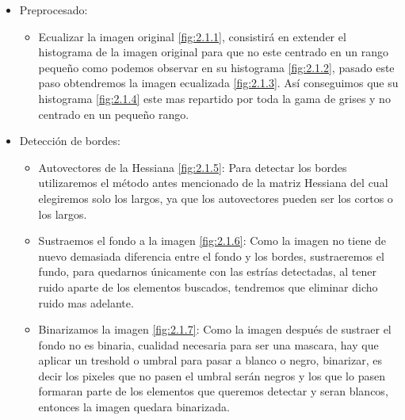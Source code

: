 \begin{itemize}
\item Preprocesado:
	\begin{itemize}
		\item Ecualizar la imagen original \ref{fig:2.1.1}, consistirá en extender el histograma de la imagen original para que no este centrado en un rango pequeño como podemos observar en su histograma \ref{fig:2.1.2}, pasado este paso obtendremos la imagen ecualizada \ref{fig:2.1.3}.
Así conseguimos que su histograma \ref{fig:2.1.4} este mas repartido por toda la gama de grises y no centrado en un pequeño rango.
	\end{itemize}
	
\item Detección de bordes:
	\begin{itemize}
		\item Autovectores de la Hessiana \ref{fig:2.1.5}:
Para detectar los bordes utilizaremos el método antes mencionado de la matriz Hessiana del cual elegiremos solo los largos, ya que los autovectores pueden ser los cortos o los largos. 
		\item Sustraemos el fondo a la imagen \ref{fig:2.1.6}:
Como la imagen no tiene de nuevo demasiada diferencia entre el fondo y los bordes, sustraeremos el fundo, para quedarnos únicamente con las estrías detectadas, al tener ruido aparte de los elementos buscados, tendremos que eliminar dicho ruido mas adelante.
		\item Binarizamos la imagen \ref{fig:2.1.7}:
Como la imagen después de sustraer el fondo no es binaria, cualidad necesaria para ser una mascara, hay que aplicar un treshold o umbral para pasar a blanco o negro, binarizar, es decir los pixeles que no pasen el umbral serán negros y los que lo pasen formaran parte de los elementos que queremos detectar y seran blancos, entonces la imagen quedara binarizada.
	\end{itemize}
	

\end{itemize}
